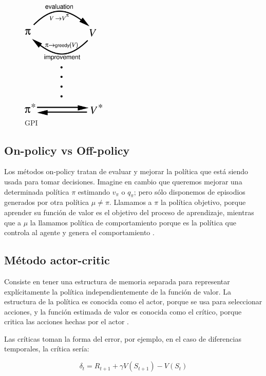 \begin{figure}[htb]
\centering
\includegraphics[width=40mm]{./graficos/gpi.png}
\caption{GPI} \label{fig:gpi}
\end{figure}


\subsection{On-policy vs Off-policy}

Los métodos on-policy tratan de evaluar y mejorar la política que está siendo usada para tomar decisiones. Imagine en cambio que queremos mejorar una determinada política $\pi$ estimando $v_\pi$ o $q_\pi$; pero sólo disponemos de episodios generados por otra política $\mu \neq \pi$. Llamamos a $\pi$ la política objetivo, porque aprender su función de valor es el objetivo del proceso de aprendizaje, mientras que a $\mu$ la llamamos política de comportamiento porque es la política que controla al agente y genera el comportamiento \cite{precup2001off}.


\subsection{Método actor-critic}

Consiste en tener una estructura de memoria separada para representar explícitamente la política independientemente de la función de valor. La estructura de la política es conocida como el actor, porque se usa para seleccionar acciones, y la función estimada de valor es conocida como el crítico, porque critica las acciones hechas por el actor \cite{barto2004j}.

Las críticas toman la forma del error, por ejemplo, en el caso de diferencias temporales, la crítica sería:

\begin{equation} \label{eq:critica_td}
\delta_t = R_{t+1} + \gamma V(S_{t+1}) - V(S_t)
\end{equation}

